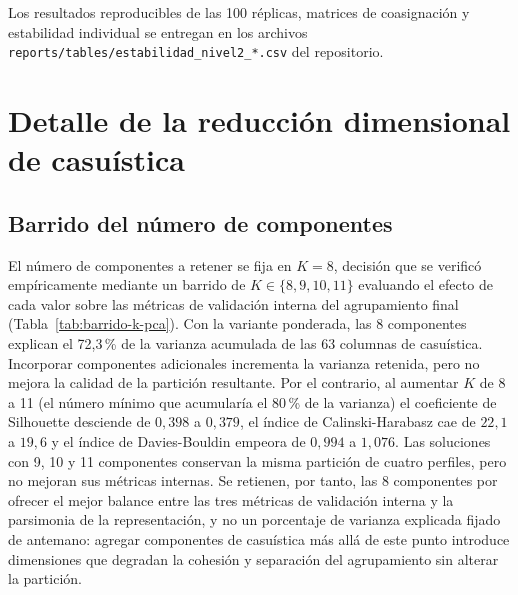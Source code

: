 Los resultados reproducibles de las 100 réplicas, matrices de coasignación y
estabilidad individual se entregan en los archivos
\texttt{reports/tables/estabilidad\_nivel2\_*.csv} del repositorio.

\section{Detalle de la reducción dimensional de casuística}
\label{anexo:pca}

\subsection{Barrido del número de componentes}

El número de componentes a retener se fija en $K=8$, decisión que se
verificó empíricamente mediante un barrido de $K \in \{8, 9, 10, 11\}$
evaluando el efecto de cada valor sobre las métricas de validación interna
del agrupamiento final (Tabla~\ref{tab:barrido-k-pca}). Con la variante
ponderada, las 8 componentes explican el 72{,}3\,\% de la varianza acumulada
de las 63 columnas de casuística. Incorporar componentes adicionales
incrementa la varianza retenida, pero no mejora la calidad de la partición
resultante. Por el contrario, al aumentar $K$ de 8 a 11 (el número mínimo
que acumularía el 80\,\% de la varianza) el coeficiente de Silhouette desciende
de $0{,}398$ a $0{,}379$, el índice de Calinski-Harabasz cae de $22{,}1$ a
$19{,}6$ y el índice de Davies-Bouldin empeora de $0{,}994$ a $1{,}076$. Las
soluciones con 9, 10 y 11 componentes conservan la misma partición de cuatro
perfiles, pero no mejoran sus métricas internas. Se retienen, por tanto, las 8
componentes por ofrecer el mejor balance entre las tres métricas de validación
interna y la parsimonia de la representación, y no un porcentaje de varianza
explicada fijado de antemano: agregar componentes de casuística más allá de
este punto introduce dimensiones que degradan la cohesión y separación del
agrupamiento sin alterar la partición.

